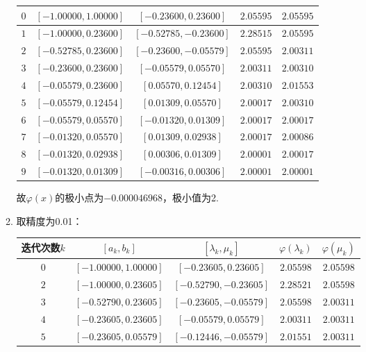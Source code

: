 \begin{enumerate}
\begin{enumerate}[label=(\arabic*)]
\begin{table}[H]
\begin{tabular}{|c|c|c|c|c|}
            $0$ & $[-1.00000,1.00000]$ & $[-0.23600,0.23600]$ & $2.05595$ & $2.05595$\\ \hline
            $1$ & $[-1.00000,0.23600]$ & $[-0.52785,-0.23600]$ & $2.28515$ & $2.05595$\\ \hline
            $2$ & $[-0.52785,0.23600]$ & $[-0.23600,-0.05579]$ & $2.05595$ & $2.00311$\\ \hline
            $3$ & $[-0.23600,0.23600]$ & $[-0.05579,0.05570]$ & $2.00311$ & $2.00310$\\ \hline
            $4$ & $[-0.05579,0.23600]$ & $[0.05570,0.12454]$ & $2.00310$ & $2.01553$\\ \hline
            $5$ & $[-0.05579,0.12454]$ & $[0.01309,0.05570]$ & $2.00017$ & $2.00310$\\ \hline
            $6$ & $[-0.05579,0.05570]$ & $[-0.01320,0.01309]$ & $2.00017$ & $2.00017$\\ \hline
            $7$ & $[-0.01320,0.05570]$ & $[0.01309,0.02938]$ & $2.00017$ & $2.00086$\\ \hline
            $8$ & $[-0.01320,0.02938]$ & $[0.00306,0.01309]$ & $2.00001$ & $2.00017$\\ \hline
            $9$ & $[-0.01320,0.01309]$ & $[-0.00316,0.00306]$ & $2.00001$ & $2.00001$\\ \hline
        \end{tabular}
    \end{table}
    故$\varphi(x)$的极小点为$-0.000046968$，极小值为2.
        \item 取精度为0.01：
        \begin{table}[H]
            \centering
            \begin{tabular}{|c|c|c|c|c|}
                \hline
                迭代次数$k$ & $[a_k,b_k]$ & $[\lambda_k,\mu_k]$ & $\varphi(\lambda_k)$ & $\varphi(\mu_k)$ \\ \hline
                $0$ & $[-1.00000,1.00000]$ & $[-0.23605,0.23605]$ & $2.05598$ & $2.05598$\\ \hline
                $2$ & $[-1.00000,0.23605]$ & $[-0.52790,-0.23605]$ & $2.28521$ & $2.05598$\\ \hline
                $3$ & $[-0.52790,0.23605]$ & $[-0.23605,-0.05579]$ & $2.05598$ & $2.00311$\\ \hline
                $4$ & $[-0.23605,0.23605]$ & $[-0.05579,0.05579]$ & $2.00311$ & $2.00311$\\ \hline
                $5$ & $[-0.23605,0.05579]$ & $[-0.12446,-0.05579]$ & $2.01551$ & $2.00311$\\ \hline

\end{tabular}
\end{table}
\end{enumerate}
\end{enumerate}
